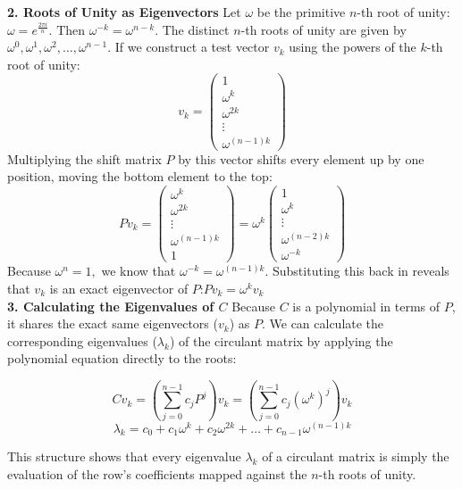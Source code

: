 {\bf 2. Roots of Unity as Eigenvectors}
Let \(\omega \) be the primitive \(n\)-th root of unity: \(\omega =e^{\frac{2\pi i}{n}} \). Then $\omega^{-k} = \omega^{n-k}$. 
The distinct \(n\)-th roots of unity are given by \(\omega^0, \omega^1, \omega^2, \dots, \omega^{n-1}\).
If we construct a test vector \(v_{k}\) using the powers of the \(k\)-th root of unity:
\[v_{k}=\left(\begin{matrix}1\\ \omega^{k}\\ \omega^{2k}\\ \vdots \\ \omega^{(n-1)k}\end{matrix}\right)\]
Multiplying the shift matrix \(P\) by this vector shifts every element up by one position, moving the bottom element to the top:
\[Pv_{k}=\left(\begin{matrix}\omega^{k}\\ \omega^{2k}\\ \vdots \\ \omega^{(n-1)k}\\ 1\end{matrix}\right)=\omega^{k}\left(\begin{matrix}1\\ \omega^{k}\\ \vdots \\ \omega^{(n-2)k}\\ \omega^{-k}\end{matrix}\right)\]
Because \(\omega^n = 1,\)  we know that \(\omega^{-k} = \omega^{(n-1)k}\). Substituting this back in reveals that \(v_{k}\) is an exact eigenvector of \(P\):\(Pv_{k}=\omega^{k}v_{k}\) \\

{\bf 3. Calculating the Eigenvalues of \(C\)}
Because \(C\) is a polynomial in terms of \(P\), it shares the exact same eigenvectors (\(v_{k}\)) as \(P\). 
We can calculate the corresponding eigenvalues (\(\lambda _{k}\)) of the circulant matrix by applying the polynomial equation directly to the roots:

\[ Cv_{k} = \left(\sum _{j=0}^{n-1}c_{j}P^{j}\right)v_{k} = \left(\sum _{j=0}^{n-1}c_{j}(\omega^{k})^{j}\right)v_{k}\] \[\lambda _{k} = c_{0}+c_{1}\omega^{k}+c_{2}\omega^{2k}+\dots +c_{n-1}\omega^{(n-1)k} \]

This structure shows that every eigenvalue \(\lambda _{k}\) of a circulant matrix is simply the evaluation of the row's coefficients mapped against the \(n\)-th roots of unity.\\

